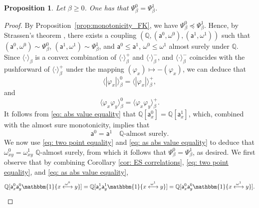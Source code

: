 \documentclass[11pt,a4paper]{article}
\newtheorem{proposition}[theorem]{Proposition}
\theoremstyle{definition}
\numberwithin{equation}{section}
\begin{document}
\begin{proposition}\label{prop: unique gibbs measure}
Let $\beta\geq 0$. One has that $\Psi^0_{\beta}=\Psi^1_{\beta}$.    
\end{proposition}

\begin{proof}
By Proposition~\ref{prop:monotonicity_FK}, we have $\Psi^0_{\beta}\preccurlyeq \Psi^1_{\beta}$. Hence, by Strassen's theorem \cite{Strassen1965}, there exists a coupling $(\mathbb{Q}, (\mathsf{a}^0,\omega^0), (\mathsf{a}^1,\omega^1))$ such that $(\mathsf{a}^0,\omega^0)\sim \Psi^0_{\beta}$, $(\mathsf{a}^1,\omega^1)\sim \Psi^1_{\beta}$, and
$\mathsf{a}^0\leq \mathsf{a}^1$, $\omega^0\leq \omega^1$ almost surely under $\mathbb{Q}$. Since $\langle \cdot \rangle_{\beta}$ is a convex combination of $\langle \cdot \rangle^+_{\beta}$ and $\langle \cdot \rangle^-_{\beta}$, and $\langle \cdot \rangle^-_{\beta}$ coincides with the pushforward of $\langle \cdot \rangle^+_{\beta}$ under the mapping $(\varphi_x) \mapsto -(\varphi_x)$, we can deduce that \begin{equation}\label{eq: abs value equality}
\langle |\varphi_x| \rangle^0_{\beta}=\langle |\varphi_x|\rangle^+_{\beta},   
\end{equation} 
and 
\begin{equation}\label{eq: two point equality}
\langle \varphi_x \varphi_y \rangle^0_{\beta}=\langle \varphi_x \varphi_y \rangle^+_{\beta}.    
\end{equation} 
It follows from \eqref{eq: abs value equality} that $\mathbb{Q}[\mathsf{a}^0_x]=\mathbb{Q}[\mathsf{a}^1_x]$, which, combined with the almost sure monotonicity, implies that
\begin{equation}\label{eq: as abs value equality}
\mathsf{a}^0=\mathsf{a}^1 \quad \mathbb{Q}\text{-almost surely}. 
\end{equation}
We now use \eqref{eq: two point equality} and \eqref{eq: as abs value equality} to deduce that $\omega^0_{xy}=\omega^1_{xy}$ $\mathbb{Q}$-almost surely, from which it follows that $\Psi^0_{\beta}=\Psi^1_{\beta}$, as desired.
We first observe that by combining Corollary \ref{cor: ES correlations}, \eqref{eq: two point equality}, and \eqref{eq: as abs value equality},
\begin{equation}
\mathbb{Q}[\mathsf{a}^0_x \mathsf{a}^0_y \mathbbm{1}\{x\overset{\omega^0}{\longleftrightarrow} y\} ]=\mathbb{Q}[\mathsf{a}^1_x \mathsf{a}^1_y\mathbbm{1}\{x\overset{\omega^1}{\longleftrightarrow} y\}]=\mathbb{Q}[\mathsf{a}^0_x \mathsf{a}^0_y\mathbbm{1}\{x\overset{\omega^1}{\longleftrightarrow} y\}].     

\end{equation}
\end{proof}
\end{document}
